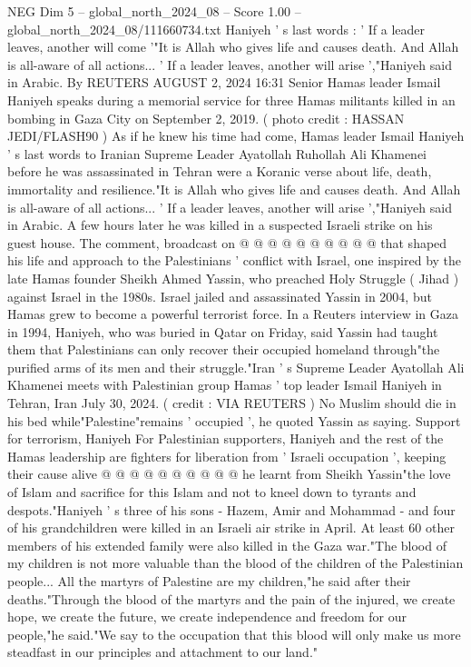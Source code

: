 \begin{textsample}{NEG Dim 5 – global\_north\_2024\_08 – Score 1.00 – global\_north\_2024\_08/111660734.txt}  \label{ex:f5_neg_080}
Haniyeh ' s last words : ' If a leader leaves, another will come '"It is Allah who gives life and causes death.
And Allah is all-aware of all actions... ' If a leader leaves, another will arise ',"Haniyeh said in Arabic.
By REUTERS AUGUST 2, 2024 16:31 Senior Hamas leader Ismail Haniyeh speaks during a memorial service for three Hamas militants killed in an bombing in Gaza City on September 2, 2019. ( photo credit : HASSAN JEDI/FLASH90 ) As if he knew his time had come, Hamas leader Ismail Haniyeh ' s last words to Iranian Supreme Leader Ayatollah Ruhollah Ali Khamenei before he was assassinated in Tehran were a Koranic verse about life, death, immortality and resilience."It is Allah who gives life and causes death.
And Allah is all-aware of all actions... ' If a leader leaves, another will arise ',"Haniyeh said in Arabic.
A few hours later he was killed in a suspected Israeli strike on his guest house.
The comment, broadcast on @ @ @ @ @ @ @ @ @ @ that shaped his life and approach to the Palestinians ' conflict with Israel, one inspired by the late Hamas founder Sheikh Ahmed Yassin, who preached Holy Struggle ( Jihad ) against Israel in the 1980s.
Israel jailed and assassinated Yassin in 2004, but Hamas grew to become a powerful terrorist force.
In a Reuters interview in Gaza in 1994, Haniyeh, who was buried in Qatar on Friday, said Yassin had taught them that Palestinians can only recover their occupied homeland through"the purified arms of its men and their struggle."Iran ' s Supreme Leader Ayatollah Ali Khamenei meets with Palestinian group Hamas ' top leader Ismail Haniyeh in Tehran, Iran July 30, 2024. ( credit : VIA REUTERS ) No Muslim should die in his bed while"Palestine"remains ' occupied ', he quoted Yassin as saying.
Support for terrorism, Haniyeh For Palestinian supporters, Haniyeh and the rest of the Hamas leadership are fighters for liberation from ' Israeli occupation ', keeping their cause alive @ @ @ @ @ @ @ @ @ @ he learnt from Sheikh Yassin"the love of Islam and sacrifice for this Islam and not to kneel down to tyrants and despots."Haniyeh ' s three of his sons - Hazem, Amir and Mohammad - and four of his grandchildren were killed in an Israeli air strike in April.
At least 60 other members of his extended family were also killed in the Gaza war."The blood of my children is not more valuable than the blood of the children of the Palestinian people...
All the martyrs of Palestine are my children,"he said after their deaths."Through the blood of the martyrs and the pain of the injured, we create hope, we create the future, we create independence and freedom for our people,"he said."We say to the occupation that this blood will only make us more steadfast in our principles and attachment to our land."

\end{textsample}
